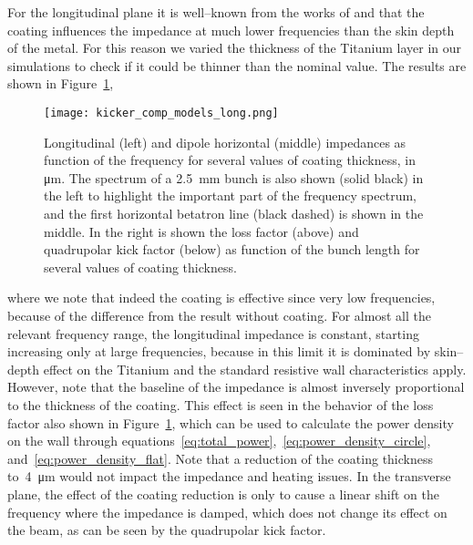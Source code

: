     For the longitudinal plane it is well--known from the works of  and  that the coating influences the impedance at much lower frequencies than the skin depth of the metal. For this reason we varied the thickness of the Titanium layer in our simulations to check if it could be thinner than the nominal value. The results are shown in Figure~\ref{fig:kicker_comp_models_long},
    \begin{figure}[t]
        \centering
        \texttt{[image: kicker\_comp\_models\_long.png]}
        \caption[Titanium coating thickness effect on impedance.]{Longitudinal (left) and dipole horizontal (middle) impedances as function of the frequency for several values of coating thickness, in \si{\micro\meter}. The spectrum of a \SI{2.5}{\milli\meter} bunch is also shown (solid black) in the left to highlight the important part of the frequency spectrum, and the first horizontal betatron line (black dashed) is shown in the middle. In the right is shown the loss factor (above) and quadrupolar kick factor (below) as function of the bunch length for several values of coating thickness.}
        \label{fig:kicker_comp_models_long}
    \end{figure}
    where we note that indeed the coating is effective since very low frequencies, because of the difference from the result without coating. For almost all the relevant frequency range, the longitudinal impedance is constant, starting increasing only at large frequencies, because in this limit it is dominated by skin--depth effect on the Titanium and the standard resistive wall characteristics apply. However, note that the baseline of the impedance is almost inversely proportional to the thickness of the coating. This effect is seen in the behavior of the loss factor also shown in Figure~\ref{fig:kicker_comp_models_long}, which can be used to calculate the power density on the wall through equations~\eqref{eq:total_power},~\eqref{eq:power_density_circle}, and~\eqref{eq:power_density_flat}. Note that a reduction of the coating thickness to~\SI{4}{\micro\meter} would not impact the impedance and heating issues. In the transverse plane, the effect of the coating reduction is only to cause a linear shift on the frequency where the impedance is damped, which does not change its effect on the beam, as can be seen by the quadrupolar kick factor.

